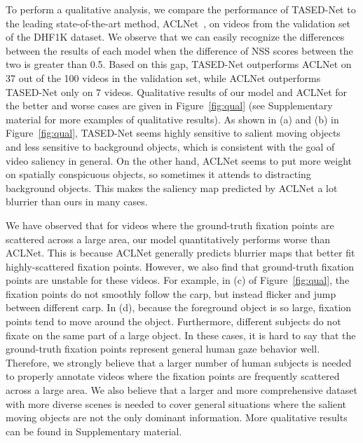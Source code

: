 \documentclass[10pt,twocolumn,letterpaper]{article}
\newcommand{\modelname}{TASED-Net}
\begin{document}
To perform a qualitative analysis, we compare the performance of \modelname{} to the leading state-of-the-art method, ACLNet~\cite{wang2018revisiting}, on videos from the validation set of the DHF1K dataset. We observe that we can easily recognize the differences between the results of each model when the difference of NSS scores between the two is greater than 0.5. Based on this gap, \modelname{} outperforms ACLNet on 37 out of the 100 videos in the validation set, while ACLNet outperforms \modelname{} only on 7 videos. Qualitative results of our model and ACLNet for the better and worse cases are given in Figure~\ref{fig:qual} (see Supplementary material for more examples of qualitative results). As shown in (a) and (b) in Figure~\ref{fig:qual}, \modelname{} seems highly sensitive to salient moving objects and less sensitive to background objects, which is consistent with the goal of video saliency in general. On the other hand, ACLNet seems to put more weight on spatially conspicuous objects, so sometimes it attends to distracting background objects. This makes the saliency map predicted by ACLNet a lot blurrier than ours in many cases.

We have observed that for videos where the ground-truth fixation points are scattered across a large area, our model quantitatively performs worse than ACLNet. This is because ACLNet generally predicts blurrier maps that better fit highly-scattered fixation points. However, we also find that ground-truth fixation points are unstable for these videos. For example, in (c) of Figure~\ref{fig:qual}, the fixation points do not smoothly follow the carp, but instead flicker and jump between different carp. In (d), because the foreground object is so large, fixation points tend to move around the object. Furthermore, different subjects do not fixate on the same part of a large object. In these cases, it is hard to say that the ground-truth fixation points represent general human gaze behavior well. Therefore, we strongly believe that a larger number of human subjects is needed to properly annotate videos where the fixation points are frequently scattered across a large area. We also believe that a larger and more comprehensive dataset with more diverse scenes is needed to cover general situations where the salient moving objects are not the only dominant information. More qualitative results can be found in Supplementary material.
\end{document}
